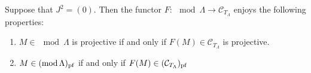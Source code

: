 %




\begin{lemma}\label{3.5.3}
Suppose that $J^2 = (0)$. Then the functor $F: \mod \Lambda \to \mathcal{C}_{T_\Lambda}$ enjoys
the following properties:

\begin{enumerate}
\item $M \in \mod \Lambda$ is projective if and only if $F(M) \in \mathcal{C}_{T_\Lambda}$ is
projective.
\item $M \in (\operatorname{mod} \Lambda)_{\mathrm{pf}}$ if and only if $F(M) \in (\mathcal{C}_{T_\Lambda})_{\mathrm{pf}}$
\end{enumerate}
\end{lemma}



